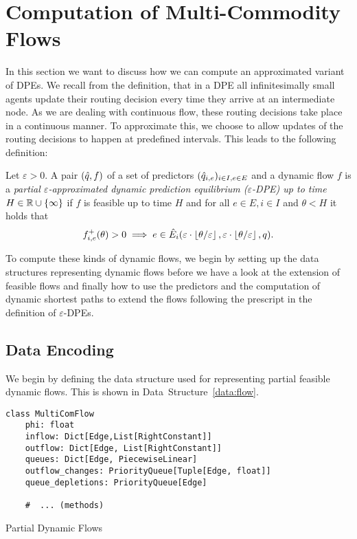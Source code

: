 \section{Computation of Multi-Commodity Flows}

In this section we want to discuss how we can compute an approximated variant of DPEs.
We recall from the definition, that in a DPE all infinitesimally small agents update their routing decision every time they arrive at an intermediate node.
As we are dealing with continuous flow, these routing decisions take place in a continuous manner.
To approximate this, we choose to allow updates of the routing decisions to happen at predefined intervals.
This leads to the following definition:

\begin{definition}
    Let $\varepsilon > 0$.
    A pair $(\hat q, f)$ of a set of predictors $(\hat q_{i,e})_{i\in I, e\in E}$ and a dynamic flow $f$ is a \emph{partial $\varepsilon$-approximated dynamic prediction equilibrium ($\varepsilon$-DPE) up to time $H\in\mathbb{R}\cup\{\infty\}$} if $f$ is feasible up to time $H$ and for all $e\in E, i\in I$ and $\theta < H$ it holds that
    \[
        {f}^+_{i,e}(\theta) > 0 \implies e \in \hat E_i(\varepsilon\cdot \left\lfloor{\theta / \varepsilon}\right\rfloor, \varepsilon\cdot \left\lfloor{\theta / \varepsilon}\right\rfloor, q).
    \]
\end{definition}

To compute these kinds of dynamic flows, we begin by setting up the data structures representing dynamic flows before we have a look at the extension of feasible flows and finally how to use the predictors and the computation of dynamic shortest paths to extend the flows following the prescript in the definition of $\varepsilon$-DPEs.


\subsection{Data Encoding}

We begin by defining the data structure used for representing partial feasible dynamic flows.
This is shown in Data~Structure~\ref{data:flow}.


\begin{classdef}
    \begin{verbatim}
class MultiComFlow
    phi: float
    inflow: Dict[Edge,List[RightConstant]]
    outflow: Dict[Edge, List[RightConstant]]
    queues: Dict[Edge, PiecewiseLinear]
    outflow_changes: PriorityQueue[Tuple[Edge, float]]
    queue_depletions: PriorityQueue[Edge]

    #  ... (methods)
\end{verbatim}
    \caption{Partial Dynamic Flows}
    \label{data:flow}
\end{classdef}

